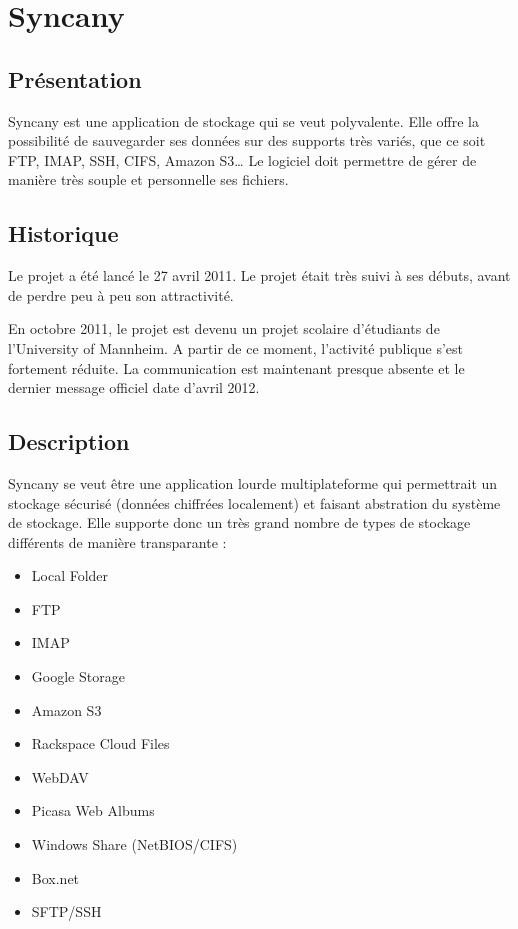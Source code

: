 \section{Syncany}
\thispagestyle{EIP} %
\subsection{Présentation}
Syncany est une application de stockage qui se veut polyvalente. Elle offre la possibilité de sauvegarder ses données sur des supports très variés, que ce soit FTP, IMAP, SSH, CIFS, Amazon S3… Le logiciel doit permettre de gérer de manière très souple et personnelle ses fichiers.

\subsection{Historique}
Le projet a été lancé le 27 avril 2011. Le projet était très suivi à ses débuts, avant de perdre peu à peu son attractivité. 

En octobre 2011, le projet est devenu un projet scolaire d'étudiants de l'University of Mannheim. A partir de ce moment, l'activité publique s'est fortement réduite. La communication est maintenant presque absente et le dernier message officiel date d'avril 2012.

\subsection{Description}
Syncany se veut être une application lourde multiplateforme qui permettrait un stockage sécurisé (données chiffrées localement) et faisant abstration du système de stockage. Elle supporte donc un très grand nombre de types de stockage différents de manière transparante :

\begin{itemize}
\renewcommand{\labelitemi}{$\bullet$}
\item Local Folder
\item FTP
\item IMAP
\item Google Storage
\item Amazon S3
\item Rackspace Cloud Files
\item WebDAV
\item Picasa Web Albums
\item Windows Share (NetBIOS/CIFS)
\item Box.net
\item SFTP/SSH
\end{itemize}

